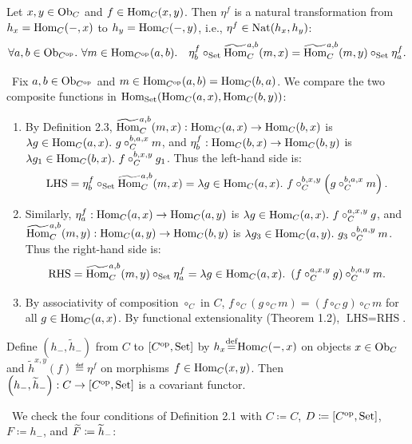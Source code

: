 \documentclass[10pt,a4paper]{article}
\begin{document}
\begin{lemma}
Let $x,y \in {\textrm{Ob}}_C$ and $f \in {\textrm{Hom}}_C(x,y)$. Then $\eta^f$ is a natural transformation from $h_x = {\textrm{Hom}}_C(-,x)$ to $h_y = {\textrm{Hom}}_C(-,y)$, i.e., $\eta^f \in {\textrm{Nat}}(h_x, h_y)$:
$$\forall a,b\in {\textrm{Ob}}_{C^{\textrm{op}}}.\ \forall m\in {\textrm{Hom}}_{C^{\textrm{op}}}(a,b).\quad \eta^f_b \circ_{\textrm{Set}} {\widetilde{{\textrm{Hom}}}\textrm{}}_C^{a,b}(m,x) = {\widetilde{{\textrm{Hom}}}\textrm{}}_C^{a,b}(m,y)\circ_{\textrm{Set}}\eta^f_a.$$
\end{lemma}
\myprf\ Fix $a, b \in {\textrm{Ob}}_{C^{\textrm{op}}}$ and $m \in {\textrm{Hom}}_{C^{\textrm{op}}}(a,b) = {\textrm{Hom}}_C(b,a)$. We compare the two composite functions in ${\textrm{Hom}}_{\textrm{Set}}({\textrm{Hom}}_C(a,x), {\textrm{Hom}}_C(b,y))$:
\begin{enumerate}
\item By Definition 2.3, ${\widetilde{{\textrm{Hom}}}\textrm{}}_C^{a,b}(m,x) : {\textrm{Hom}}_C(a,x) \to {\textrm{Hom}}_C(b,x)$ is $\lambda g \in {\textrm{Hom}}_C(a,x).\ g \circ_C^{b,a,x} m$, and $\eta^f_b : {\textrm{Hom}}_C(b,x) \to {\textrm{Hom}}_C(b,y)$ is $\lambda g_1 \in {\textrm{Hom}}_C(b,x).\ f \circ_C^{b,x,y} g_1$. Thus the left-hand side is:
$$\textrm{LHS} = \eta^f_b \circ_{\textrm{Set}} {\widetilde{{\textrm{Hom}}}\textrm{}}_C^{a,b}(m,x) = \lambda g \in {\textrm{Hom}}_C(a,x).\ f \circ_C^{b,x,y} \left(g \circ_C^{b,a,x} m\right).$$
\item Similarly, $\eta^f_a : {\textrm{Hom}}_C(a,x) \to {\textrm{Hom}}_C(a,y)$ is $\lambda g \in {\textrm{Hom}}_C(a,x).\ f \circ_C^{a,x,y} g$, and ${\widetilde{{\textrm{Hom}}}\textrm{}}_C^{a,b}(m,y) : {\textrm{Hom}}_C(a,y) \to {\textrm{Hom}}_C(b,y)$ is $\lambda g_3 \in {\textrm{Hom}}_C(a,y).\ g_3 \circ_C^{b,a,y} m$. Thus the right-hand side is:
$$\textrm{RHS} = {\widetilde{{\textrm{Hom}}}\textrm{}}_C^{a,b}(m,y) \circ_{\textrm{Set}} \eta^f_a = \lambda g \in {\textrm{Hom}}_C(a,x).\ \left(f \circ_C^{a,x,y} g\right) \circ_C^{b,a,y} m.$$
\item By associativity of composition $\circ_C$ in $C$, $f \circ_C (g \circ_C m) = (f \circ_C g) \circ_C m$ for all $g \in {\textrm{Hom}}_C(a,x)$. By functional extensionality (Theorem 1.2), $\textrm{LHS} = \textrm{RHS}$.
\end{enumerate}
\myqed
\begin{lemma}
Define $\left(h_-, \widetilde{h}_-\right)$ from $C$ to $[C^{\textrm{op}}, {\textrm{Set}}]$ by $h_x {\stackrel{{\textrm{def}}}{=}} {\textrm{Hom}}_C(-,x)$ on objects $x \in {\textrm{Ob}}_C$ and $\widetilde{h}^{x,y}(f) \eqdef \eta^f$ on morphisms $f \in {\textrm{Hom}}_C(x,y)$. Then $\left(h_-, \widetilde{h}_-\right) : C \to [C^{\textrm{op}}, {\textrm{Set}}]$ is a covariant functor.
\end{lemma}
\myprf\ We check the four conditions of Definition 2.1 with $C \coloneqq C$, $D \coloneqq [C^{\textrm{op}},{\textrm{Set}}]$, $F \coloneqq h_-$, and ${\widetilde{F}\textrm{}} \coloneqq \widetilde{h}_-$:
\end{document}
